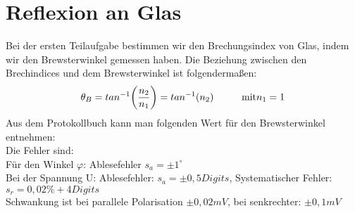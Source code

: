 

\section{Reflexion an Glas}
Bei der ersten Teilaufgabe bestimmen wir den Brechungsindex von Glas, indem wir den Brewsterwinkel gemessen haben. 
Die Beziehung zwischen den Brechindices und dem Brewsterwinkel ist folgendermaßen:\\
\begin{equation}
\theta_B=tan^{-1}\biggl( \frac{n_2}{n_1}\biggr)=tan^{-1}(n_2)  \tab \text{mit} n_1=1
\end{equation}
Aus dem Protokollbuch kann man folgenden Wert für den Brewsterwinkel entnehmen:\\
Die Fehler sind:\\
Für den Winkel $\varphi$: 
Ablesefehler $s_a=\pm1^\circ$\\
Bei der Spannung U: Ablesefehler: $s_a=\pm0,5 Digits$, Systematischer Fehler: $s_r=0,02\% + 4Digits$\\
Schwankung ist bei parallele Polarisation $\pm0,02mV$, bei senkrechter: $\pm0,1mV$\\

